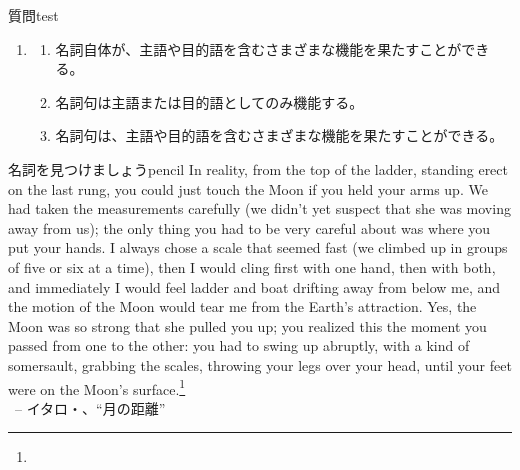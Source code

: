 \begin{tblsframedsymbol}{質問}{test}
\begin{enumerate}[noitemsep, leftmargin=*]
\begin{enumerate}[noitemsep]
        \end{enumerate}
        \item\begin{enumerate}[noitemsep]
            \item 名詞自体が、主語や目的語を含むさまざまな機能を果たすことができる。
            \item 名詞句は主語または目的語としてのみ機能する。
            \item 名詞句は、主語や目的語を含むさまざまな機能を果たすことができる。
        \end{enumerate}
    \end{enumerate}
\end{tblsframedsymbol}



\begin{tblsframedsymbol}{名詞を見つけましょう}{pencil}
    In reality, from the top of the ladder, standing erect on the last rung, you could just touch the Moon if you held your arms up. We had taken the measurements carefully (we didn't yet suspect that she was moving away from us); the only thing you had to be very careful about was where you put your hands. I always chose a scale that seemed fast (we climbed up in groups of five or six at a time), then I would cling first with one hand, then with both, and immediately I would feel ladder and boat drifting away from below me, and the motion of the Moon would tear me from the Earth's attraction. Yes, the Moon was so strong that she pulled you up; you realized this the moment you passed from one to the other: you had to swing up abruptly, with a kind of somersault, grabbing the scales, throwing your legs over your head, until your feet were on the Moon's surface.\footnote{}\\\phantom{~}\hfill~-- イタロ・\citeauthor{calvino2018}、\enquote{月の距離}

\end{tblsframedsymbol}

